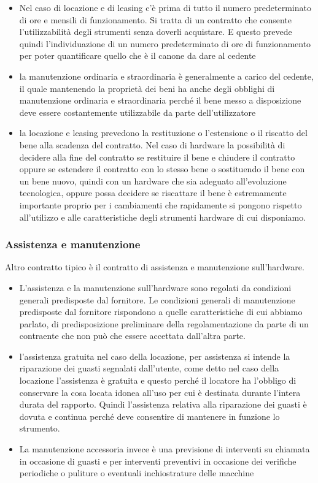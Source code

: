 \begin{itemize}
    \item Nel caso di locazione e di leasing c'è prima di tutto il numero predeterminato di ore e mensili di funzionamento. Si tratta di un contratto che consente l'utilizzabilità degli strumenti senza doverli acquistare. E questo prevede quindi l'individuazione di un numero predeterminato di ore di funzionamento per poter quantificare quello che è il canone da dare al cedente
    \item la manutenzione ordinaria e straordinaria è generalmente a carico del cedente, il quale mantenendo la proprietà dei beni ha anche degli obblighi di manutenzione ordinaria e straordinaria perché il bene messo a disposizione deve essere costantemente utilizzabile da parte dell'utilizzatore 
    \item la locazione e leasing prevedono la restituzione o l'estensione o il riscatto del bene alla scadenza del contratto. Nel caso di hardware la possibilità di decidere alla fine del contratto se restituire il bene e chiudere il contratto oppure se estendere il contratto con lo stesso bene o sostituendo il bene con un bene nuovo, quindi con un hardware che sia adeguato all'evoluzione tecnologica, oppure possa decidere se riscattare il bene è estremamente importante proprio per i cambiamenti che rapidamente si pongono rispetto all'utilizzo e alle caratteristiche degli strumenti hardware di cui disponiamo.
\end{itemize}

\subsubsection{Assistenza e manutenzione}
Altro contratto tipico è il contratto di assistenza e manutenzione sull'hardware. 

\begin{itemize}
    \item L'assistenza e la manutenzione sull'hardware sono regolati da condizioni generali predisposte dal fornitore. Le condizioni generali di manutenzione predisposte dal fornitore rispondono a quelle caratteristiche di cui abbiamo parlato, di predisposizione preliminare della regolamentazione da parte di un contraente che non può che essere accettata dall'altra parte. 
    \item l'assistenza gratuita nel caso della locazione, per assistenza si intende la riparazione dei guasti segnalati dall'utente, come detto nel caso della locazione l'assistenza è gratuita e questo perché il locatore ha l'obbligo di conservare la cosa locata idonea all'uso per cui è destinata durante l'intera durata del rapporto. Quindi l'assistenza relativa alla riparazione dei guasti è dovuta e continua perché deve consentire di mantenere in funzione lo strumento. 
    \item La manutenzione accessoria invece è una previsione di interventi su chiamata in occasione di guasti e per interventi preventivi in occasione dei verifiche periodiche o puliture o eventuali inchiostrature delle macchine
\end{itemize}

